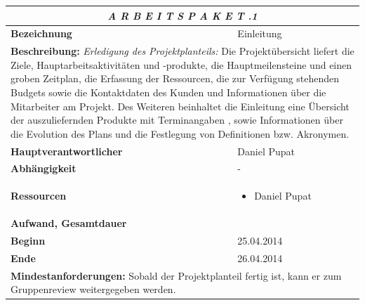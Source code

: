 \documentclass[fontsize=12pt,paper=a4,twoside]{scrartcl}
\begin{document}
\begin{tabular}{p{7.5cm}|p{7.5cm}}\toprule
\multicolumn{2}{c}{\textbf{\textit{A R B E I T S P A K E T \quad 1.1.1}}} \\ \toprule \hline
\textbf{Bezeichnung} & Einleitung\\\hline
\multicolumn{2}{p{15cm}}{\textbf{Beschreibung:} \newline 
\textit{Erledigung des Projektplanteils:} Die Projektübersicht liefert die Ziele, Hauptarbeitsaktivitäten und -produkte, die Hauptmeilensteine und einen groben Zeitplan, die Erfassung der Ressourcen, die zur Verfügung stehenden Budgets sowie die Kontaktdaten des Kunden und Informationen über die Mitarbeiter am Projekt. Des Weiteren beinhaltet die Einleitung eine Übersicht der auszuliefernden  Produkte mit Terminangaben , sowie Informationen über die Evolution des Plans und die Festlegung von Definitionen bzw. Akronymen.}  \\\hline
\textbf{Hauptverantwortlicher} & Daniel Pupat\\\hline
\textbf{Abhängigkeit} & -\\\hline
\textbf{Ressourcen} & \begin{itemize}
\itemsep0pt
\item Daniel Pupat
\end{itemize} \\\hline
\textbf{Aufwand, Gesamtdauer} & \\\hline
\textbf{Beginn} & 25.04.2014 \\\hline
\textbf{Ende} & 26.04.2014\\\hline
\multicolumn{2}{p{15cm}}{\textbf{Mindestanforderungen: } \newline
Sobald der Projektplanteil fertig ist, kann er zum Gruppenreview weitergegeben werden. }  \\ \toprule
\end{tabular} \\\\
\end{document}
